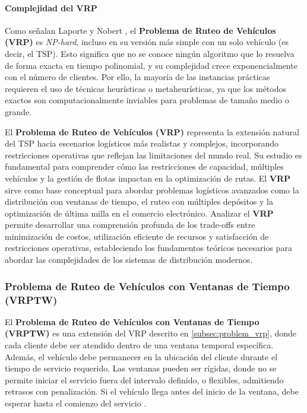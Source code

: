 \documentclass[12pt,titlepage,twoside,openright]{book}
\begin{document}
\paragraph{Complejidad del VRP}
\label{subsec:complejidad_vrp}

Como señalan Laporte y Nobert \cite{laporte1987}, el \textbf{Problema de Ruteo de Vehículos (VRP)} es \textit{NP-hard}, incluso en su versión más simple con un solo vehículo (es decir, el TSP). Esto significa que no se conoce ningún algoritmo que lo resuelva de forma exacta en tiempo polinomial, y su complejidad crece exponencialmente con el número de clientes. Por ello, la mayoría de las instancias prácticas requieren el uso de técnicas heurísticas o metaheurísticas, ya que los métodos exactos son computacionalmente inviables para problemas de tamaño medio o grande.

El \textbf{Problema de Ruteo de Vehículos (VRP)} representa la extensión natural del TSP hacia escenarios logísticos más realistas y complejos, incorporando restricciones operativas que reflejan las limitaciones del mundo real. Su estudio es fundamental para comprender cómo las restricciones de capacidad, múltiples vehículos y la gestión de flotas impactan en la optimización de rutas. El \textbf{VRP} sirve como base conceptual para abordar problemas logísticos avanzados como la distribución con ventanas de tiempo, el ruteo con múltiples depósitos y la optimización de última milla en el comercio electrónico. Analizar el \textbf{VRP} permite desarrollar una comprensión profunda de los trade-offs entre minimización de costos, utilización eficiente de recursos y satisfacción de restricciones operativas, estableciendo los fundamentos teóricos necesarios para abordar las complejidades de los sistemas de distribución modernos.

\subsubsection{Problema de Ruteo de Vehículos con Ventanas de Tiempo (VRPTW)}

El \textbf{Problema de Ruteo de Vehículos con Ventanas de Tiempo (VRPTW)} es una extensión del VRP descrito en \autoref{subsec:problem_vrp}, donde cada cliente debe ser atendido dentro de una ventana temporal específica. Además, el vehículo debe permanecer en la ubicación del cliente durante el tiempo de servicio requerido. Las ventanas pueden ser rígidas, donde no se permite iniciar el servicio fuera del intervalo definido, o flexibles, admitiendo retrasos con penalización. Si el vehículo llega antes del inicio de la ventana, debe esperar hasta el comienzo del servicio \citep{toth2014}.
\end{document}
